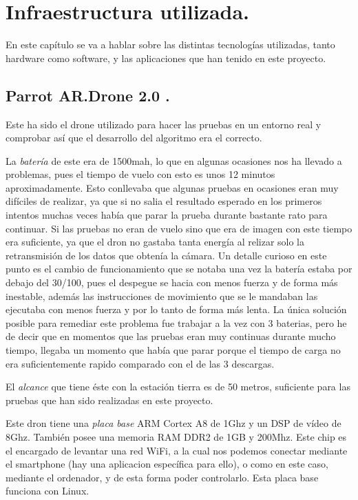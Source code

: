 \chapter{Infraestructura utilizada.}\label{cap.infraestructura}
En este cap\'itulo se va a hablar sobre las distintas tecnolog\'ias utilizadas, tanto hardware como software, y las aplicaciones que han tenido en este proyecto. 

\section{Parrot AR.Drone 2.0 .}
\hspace{1 cm} Este ha sido el drone utilizado para hacer las pruebas en un entorno real y comprobar as\'i que el desarrollo del algoritmo era el correcto. 

\hspace{1 cm} La \textsl{bater\'ia} de este era de 1500mah, lo que en algunas ocasiones nos ha llevado a problemas, pues el tiempo de vuelo con esto es unos 12 minutos aproximadamente. Esto conllevaba que algunas pruebas en ocasiones eran muy dif\'iciles de realizar, ya que si no salia el resultado esperado en los primeros intentos muchas veces hab\'ia que parar la prueba durante bastante rato para continuar. Si las pruebas no eran de vuelo sino que era de imagen con este tiempo era suficiente, ya que el dron no gastaba tanta energ\'ia al relizar solo la retransmisi\'on de los datos que obten\'ia la c\'amara. Un detalle curioso en este punto es el cambio de funcionamiento que se notaba una vez la bater\'ia estaba por debajo del 30/100, pues el despegue se hacia con menos fuerza y de forma m\'as inestable, adem\'as las instrucciones de movimiento que se le mandaban las ejecutaba con menos fuerza y por lo tanto de forma m\'as lenta. La \'unica soluci\'on posible para remediar este problema fue trabajar a la vez con 3 baterias, pero he de decir que en momentos que las pruebas eran muy continuas durante mucho tiempo, llegaba un momento que hab\'ia que parar porque el tiempo de carga no era suficientemente rapido comparado con el de las 3 descargas. 

\hspace{1 cm} El \textsl{alcance} que tiene \'este con la estaci\'on tierra es de 50 metros, suficiente para las pruebas que han sido realizadas en este proyecto. 

\hspace{1 cm} Este dron tiene una \textsl{placa base} ARM Cortex A8 de 1Ghz y un DSP de v\'ideo de 8Ghz. Tambi\'en posee una memoria RAM DDR2 de 1GB y 200Mhz. Este chip es el encargado de levantar una red WiFi, a la cual nos podemos conectar mediante el smartphone (hay una aplicacion espec\'ifica para ello), o como en este caso, mediante el ordenador, y de esta forma poder controlarlo. Esta placa base funciona con Linux. 

